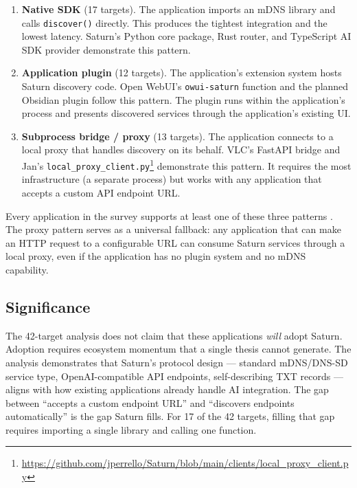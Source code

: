 \begin{enumerate}
\item \textbf{Native SDK} (17 targets). The application imports an mDNS library and calls \texttt{discover()} directly. This produces the tightest integration and the lowest latency. Saturn's Python core package, Rust router, and TypeScript AI SDK provider demonstrate this pattern.

\item \textbf{Application plugin} (12 targets). The application's extension system hosts Saturn discovery code. Open WebUI's \texttt{owui-saturn} function and the planned Obsidian plugin follow this pattern. The plugin runs within the application's process and presents discovered services through the application's existing UI.

\item \textbf{Subprocess bridge / proxy} (13 targets). The application connects to a local proxy that handles discovery on its behalf. VLC's FastAPI bridge and Jan's \texttt{local\_proxy\_client.py}\footnote{\url{https://github.com/jperrello/Saturn/blob/main/clients/local_proxy_client.py}} demonstrate this pattern. It requires the most infrastructure (a separate process) but works with any application that accepts a custom API endpoint URL.
\end{enumerate}

Every application in the survey supports at least one of these three patterns . The proxy pattern serves as a universal fallback: any application that can make an HTTP request to a configurable URL can consume Saturn services through a local proxy, even if the application has no plugin system and no mDNS capability.

\subsection{Significance}

The 42-target analysis does not claim that these applications \textit{will} adopt Saturn. Adoption requires ecosystem momentum that a single thesis cannot generate. The analysis demonstrates that Saturn's protocol design --- standard mDNS/DNS-SD service type, OpenAI-compatible API endpoints, self-describing TXT records --- aligns with how existing applications already handle AI integration. The gap between ``accepts a custom endpoint URL'' and ``discovers endpoints automatically'' is the gap Saturn fills. For 17 of the 42 targets, filling that gap requires importing a single library and calling one function.
